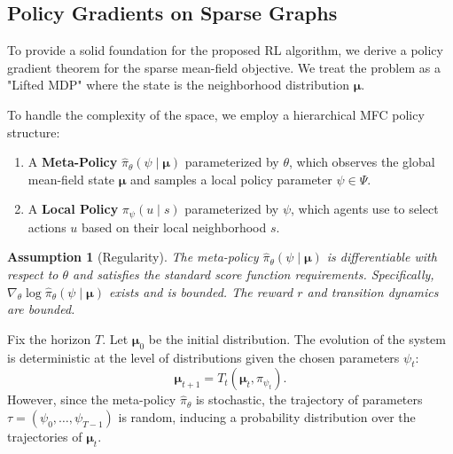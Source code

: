 \documentclass{article}
\newtheorem{assumption}{Assumption}
\begin{document}
\subsection{Policy Gradients on Sparse Graphs}
To provide a solid foundation for the proposed RL algorithm, we derive a policy gradient theorem for the sparse mean-field objective. We treat the problem as a "Lifted MDP" where the state is the neighborhood distribution $\boldsymbol{\mu}$.

To handle the complexity of the space, we employ a hierarchical MFC policy structure:
\begin{enumerate}[noitemsep,topsep=0pt]
    \item A \textbf{Meta-Policy} $\hat{\pi}_\theta(\psi \mid \boldsymbol{\mu})$ parameterized by $\theta$, which observes the global mean-field state $\boldsymbol{\mu}$ and samples a local policy parameter $\psi \in \Psi$.
    \item A \textbf{Local Policy} $\pi_\psi(u \mid s)$ parameterized by $\psi$, which agents use to select actions $u$ based on their local neighborhood $s$.
\end{enumerate}

\begin{assumption}[Regularity]
\label{ass:policy-domination}
The meta-policy $\hat{\pi}_\theta(\psi \mid \boldsymbol{\mu})$ is differentiable with respect to $\theta$ and satisfies the standard score function requirements. Specifically, $\nabla_\theta \log \hat{\pi}_\theta(\psi \mid \boldsymbol{\mu})$ exists and is bounded. The reward $r$ and transition dynamics are bounded.
\end{assumption}

Fix the horizon $T$. Let $\boldsymbol{\mu}_0$ be the initial distribution. The evolution of the system is deterministic at the level of distributions given the chosen parameters $\psi_t$:
\[ \boldsymbol{\mu}_{t+1} = T_t(\boldsymbol{\mu}_t, \pi_{\psi_t}). \]
However, since the meta-policy $\hat{\pi}_\theta$ is stochastic, the trajectory of parameters $\tau = (\psi_0, \dots, \psi_{T-1})$ is random, inducing a probability distribution over the trajectories of $\boldsymbol{\mu}_t$.
\end{document}
